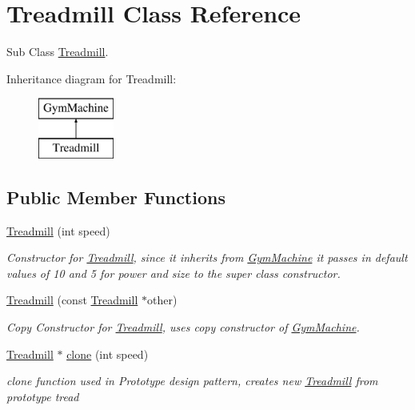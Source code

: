 \hypertarget{class_treadmill}{}\section{Treadmill Class Reference}
\label{class_treadmill}


Sub Class \hyperlink{class_treadmill}{Treadmill}.  


Inheritance diagram for Treadmill\+:\begin{figure}[H]
\begin{center}
\leavevmode
\includegraphics[height=2.000000cm]{class_treadmill}
\end{center}
\end{figure}
\subsection*{Public Member Functions}
\begin{DoxyCompactItemize}
\item 
\hypertarget{class_treadmill_a729fe8dba8c5be57f4b74de245b409f4}{}\hyperlink{class_treadmill_a729fe8dba8c5be57f4b74de245b409f4}{Treadmill} (int speed)\label{class_treadmill_a729fe8dba8c5be57f4b74de245b409f4}

\begin{DoxyCompactList}\small\item\em Constructor for \hyperlink{class_treadmill}{Treadmill}, since it inherits from \hyperlink{class_gym_machine}{Gym\+Machine} it passes in default values of 10 and 5 for power and size to the super class constructor. \end{DoxyCompactList}\item 
\hypertarget{class_treadmill_a6061b1313ceddd6f631fcd9bc7999afd}{}\hyperlink{class_treadmill_a6061b1313ceddd6f631fcd9bc7999afd}{Treadmill} (const \hyperlink{class_treadmill}{Treadmill} $\ast$other)\label{class_treadmill_a6061b1313ceddd6f631fcd9bc7999afd}

\begin{DoxyCompactList}\small\item\em Copy Constructor for \hyperlink{class_treadmill}{Treadmill}, uses copy constructor of \hyperlink{class_gym_machine}{Gym\+Machine}. \end{DoxyCompactList}\item 
\hypertarget{class_treadmill_ab855c0fb00dda980bb02111caf3416de}{}\hyperlink{class_treadmill}{Treadmill} $\ast$ \hyperlink{class_treadmill_ab855c0fb00dda980bb02111caf3416de}{clone} (int speed)\label{class_treadmill_ab855c0fb00dda980bb02111caf3416de}

\begin{DoxyCompactList}\small\item\em clone function used in Prototype design pattern, creates new \hyperlink{class_treadmill}{Treadmill} from prototype \textquotesingle{}tread\textquotesingle{} \end{DoxyCompactList}\end{DoxyCompactItemize}
